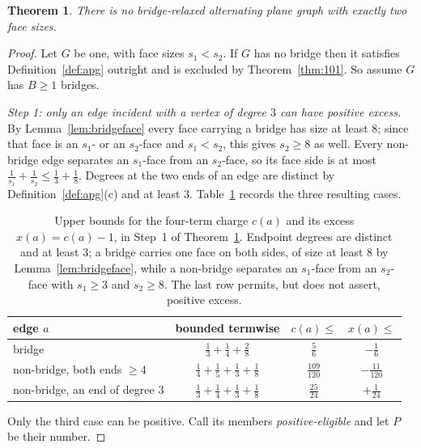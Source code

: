 \documentclass{baustms}
\theoremstyle{cupthm}
\newtheorem{theorem}{Theorem}[section]
\theoremstyle{cupdefn}
\theoremstyle{cuprem}
\begin{document}
\begin{theorem}\label{thm:x2weak}
There is no bridge-relaxed alternating plane graph with exactly two face sizes.
\end{theorem}

\begin{proof}
Let $G$ be one, with face sizes $s_1 < s_2$. If $G$ has no bridge then it
satisfies Definition~\ref{def:apg} outright and is excluded by
Theorem~\ref{thm:101}. So assume $G$ has $B \ge 1$ bridges.

\smallskip
\emph{Step 1: only an edge incident with a vertex of degree $3$ can have positive
excess.} By Lemma~\ref{lem:bridgeface} every face carrying a bridge has size at
least $8$; since that face is an $s_1$- or an $s_2$-face and $s_1 < s_2$, this
gives $s_2 \ge 8$ as well. Every non-bridge edge separates an $s_1$-face from an
$s_2$-face, so its face side is at most $\tfrac1{s_1}+\tfrac1{s_2} \le
\tfrac13+\tfrac18$. Degrees at the two ends of an edge are distinct by
Definition~\ref{def:apg}(c) and at least $3$. Table~\ref{tab:cases} records the
three resulting cases.

\begin{table}[ht]
\centering
\small
\begin{tabular}{lccc}
\toprule
edge $a$ & bounded termwise & $c(a) \le$ & $x(a) \le$ \\
\midrule
bridge
 & $\tfrac13+\tfrac14 + \tfrac28$
 & $\tfrac56$ & $-\tfrac16$ \\[2pt]
non-bridge, both ends $\ge 4$
 & $\tfrac14+\tfrac15 + \tfrac13+\tfrac18$
 & $\tfrac{109}{120}$ & $-\tfrac{11}{120}$ \\[2pt]
non-bridge, an end of degree $3$
 & $\tfrac13+\tfrac14 + \tfrac13+\tfrac18$
 & $\tfrac{25}{24}$ & $+\tfrac1{24}$ \\
\bottomrule
\end{tabular}
\caption{Upper bounds for the four-term charge $c(a)$ and its excess
$x(a)=c(a)-1$, in Step~1 of Theorem~\ref{thm:x2weak}. Endpoint degrees are
distinct and at least $3$; a bridge carries one face on both sides, of size at
least $8$ by Lemma~\ref{lem:bridgeface}, while a non-bridge separates an
$s_1$-face from an $s_2$-face with $s_1 \ge 3$ and $s_2 \ge 8$. The last row
permits, but does not assert, positive excess.}\label{tab:cases}
\end{table}

Only the third case can be positive. Call its members \emph{positive-eligible}
and let $P$ be their number.


\end{proof}
\end{document}

